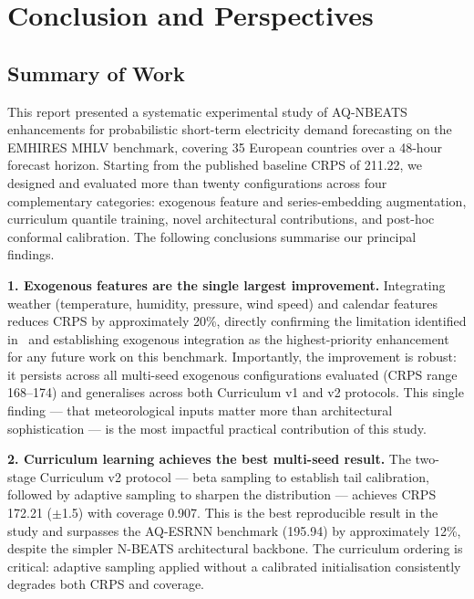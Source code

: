 \chapter*{Conclusion and Perspectives}
\label{chap:conclusion}

\section*{Summary of Work}

\noindent
This report presented a systematic experimental study of AQ-NBEATS
enhancements for probabilistic short-term electricity demand forecasting
on the EMHIRES MHLV benchmark, covering 35 European countries over a
48-hour forecast horizon. Starting from the published baseline CRPS of
211.22, we designed and evaluated more than twenty configurations across
four complementary categories: exogenous feature and series-embedding
augmentation, curriculum quantile training, novel architectural
contributions, and post-hoc conformal calibration. The following
conclusions summarise our principal findings.

\vspace{0.5cm}

\noindent
\textbf{1. Exogenous features are the single largest improvement.}
Integrating weather (temperature, humidity, pressure, wind speed) and
calendar features reduces CRPS by approximately 20\%, directly
confirming the limitation identified in~\cite{smyl2025anyquantile} and
establishing exogenous integration as the highest-priority enhancement
for any future work on this benchmark. Importantly, the improvement
is robust: it persists across all multi-seed exogenous configurations
evaluated (CRPS range 168--174) and generalises across both Curriculum
v1 and v2 protocols. This single finding --- that meteorological inputs
matter more than architectural sophistication --- is the most impactful
practical contribution of this study.

\vspace{0.3cm}

\noindent
\textbf{2. Curriculum learning achieves the best multi-seed result.}
The two-stage Curriculum v2 protocol --- beta sampling to establish
tail calibration, followed by adaptive sampling to sharpen the
distribution --- achieves CRPS 172.21 ($\pm$1.5) with coverage 0.907.
This is the best reproducible result in the study and surpasses the
AQ-ESRNN benchmark (195.94) by approximately 12\%, despite the simpler
N-BEATS architectural backbone. The curriculum ordering is critical:
adaptive sampling applied without a calibrated initialisation
consistently degrades both CRPS and coverage.

